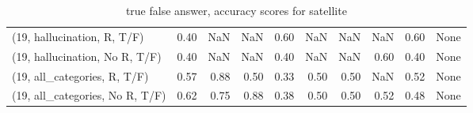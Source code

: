 \begin{table*}[h!]
\begin{adjustbox}{width=2\columnwidth,center}
\begin{tabular}{lrrr|rrr|rrr}
(19, hallucination, R, T/F)           &                      0.40 &                   NaN &                       NaN &                          0.60 &                       NaN &                           NaN &                                    NaN &                               0.60 &                                  None \\
(19, hallucination, No R, T/F)        &                      0.40 &                   NaN &                       NaN &                          0.40 &                       NaN &                           NaN &                                   0.60 &                               0.40 &                                  None \\
(19, all\_categories, R, T/F)          &                      0.57 &                  0.88 &                      0.50 &                          0.33 &                      0.50 &                          0.50 &                                    NaN &                               0.52 &                                  None \\
(19, all\_categories, No R, T/F)       &                      0.62 &                  0.75 &                      0.88 &                          0.38 &                      0.50 &                          0.50 &                                   0.52 &                               0.48 &                                  None \\


\bottomrule
\end{tabular}
\end{adjustbox}
\caption{true false answer, accuracy scores for satellite}
\end{table*}